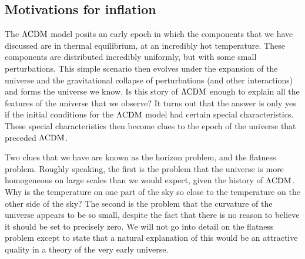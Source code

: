     \subsection{Motivations for inflation}
    The $\Lambda\text{CDM}$ model posits an early epoch in which the components that
    we have discussed are in thermal equilibrium,
    at an incredibly hot temperature.
    These components are distributed incredibly uniformly, but with some small perturbations.
    This simple scenario then evolves under the expansion of the universe
    and the gravitational collapse of perturbations (and other interactions) and forms the universe we know.
    Is this story of $\Lambda\text{CDM}$ enough to explain all the features of the
    universe that we observe?
    It turns out that the answer is only yes if the initial conditions for the $\Lambda\text{CDM}$
    model had certain special characteristics.
    These special characteristics then become clues to the epoch of the universe
    that preceded $\Lambda\text{CDM}$.


    Two clues that we have are known as the horizon problem, and the flatness problem.
    Roughly speaking, the first is the problem that the universe is more homogeneous on
    large scales than we would expect, given the history of $\Lambda\text{CDM}$. Why is the temperature on one
    part of the sky so close to the temperature on the other side of the sky?
    The second is the problem that the curvature of the universe appears to be so
    small, despite the fact that there is no reason to believe it should be set to precisely
    zero.
    We will not go into detail on the flatness problem except to state that
    a natural explanation of this would be an attractive quality in a
    theory of the very early universe.


